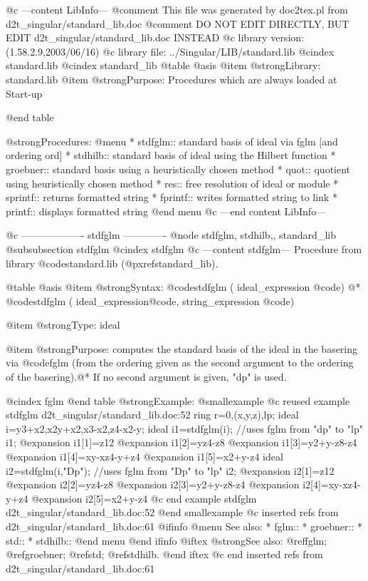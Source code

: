 @c ---content LibInfo---
@comment This file was generated by doc2tex.pl from d2t_singular/standard_lib.doc
@comment DO NOT EDIT DIRECTLY, BUT EDIT d2t_singular/standard_lib.doc INSTEAD
@c library version: (1.58.2.9,2003/06/16)
@c library file: ../Singular/LIB/standard.lib
@cindex standard.lib
@cindex standard_lib
@table @asis
@item @strong{Library:}
standard.lib
@item @strong{Purpose:}
   Procedures which are always loaded at Start-up

@end table

@strong{Procedures:}
@menu
* stdfglm:: standard basis of ideal via fglm [and ordering ord]
* stdhilb:: standard basis of ideal using the Hilbert function
* groebner:: standard basis using a heuristically chosen method
* quot:: quotient using heuristically chosen method
* res:: free resolution of ideal or module
* sprintf:: returns formatted string
* fprintf:: writes formatted string to link
* printf:: displays formatted string
@end menu
@c ---end content LibInfo---

@c ------------------- stdfglm -------------
@node stdfglm, stdhilb,, standard_lib
@subsubsection stdfglm
@cindex stdfglm
@c ---content stdfglm---
Procedure from library @code{standard.lib} (@pxref{standard_lib}).

@table @asis
@item @strong{Syntax:}
@code{stdfglm (} ideal_expression @code{)} @*
@code{stdfglm (} ideal_expression@code{,} string_expression @code{)}

@item @strong{Type:}
ideal

@item @strong{Purpose:}
computes the standard basis of the ideal in the basering
via @code{fglm} (from the ordering given as the second argument
to the ordering of the basering).@*
If no second argument is given, "dp" is used.

@cindex fglm
@end table
@strong{Example:}
@smallexample
@c reused example stdfglm d2t_singular/standard_lib.doc:52 
   ring r=0,(x,y,z),lp;
ideal i=y3+x2,x2y+x2,x3-x2,z4-x2-y;
ideal i1=stdfglm(i);         //uses fglm from "dp" to "lp"
i1;
@expansion{} i1[1]=z12
@expansion{} i1[2]=yz4-z8
@expansion{} i1[3]=y2+y-z8-z4
@expansion{} i1[4]=xy-xz4-y+z4
@expansion{} i1[5]=x2+y-z4
ideal i2=stdfglm(i,"Dp");    //uses fglm from "Dp" to "lp"
i2;
@expansion{} i2[1]=z12
@expansion{} i2[2]=yz4-z8
@expansion{} i2[3]=y2+y-z8-z4
@expansion{} i2[4]=xy-xz4-y+z4
@expansion{} i2[5]=x2+y-z4
@c end example stdfglm d2t_singular/standard_lib.doc:52
@end smallexample
@c inserted refs from d2t_singular/standard_lib.doc:61
@ifinfo
@menu
See also:
* fglm::
* groebner::
* std::
* stdhilb::
@end menu
@end ifinfo
@iftex
@strong{See also:}
@ref{fglm};
@ref{groebner};
@ref{std};
@ref{stdhilb}.
@end iftex
@c end inserted refs from d2t_singular/standard_lib.doc:61


